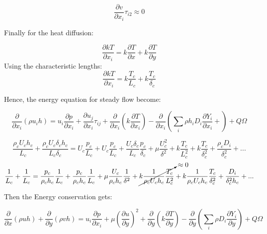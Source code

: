 \begin{equation} 
\frac{\partial v}{\partial x_i}\tau_{i2}\approx0
\end{equation} 

Finally for the heat diffusion:

\begin{equation} 
\frac{\partial kT}{\partial x_i}
=
k
\frac{\partial T}{\partial x}+
k
\frac{\partial T}{\partial y}
\end{equation} 
%
Using the characteristic lengths: 
%
\begin{equation} 
\frac{\partial kT}{\partial x_i}
=
k
\frac{ T_c}{L_c}
+
k
\frac{ T_c}{\delta_c}
\end{equation} 
%

Hence, the energy equation for steady flow become:

\begin{equation} 
\frac{\partial}{\partial x_i}(\rho u_i h)=
u_i\frac{\partial p}{\partial x_i}+
\frac{\partial u_j}{\partial x_i}\tau_{ij}
+
\frac{\partial}{\partial x_i}\left(k\frac{\partial T}{\partial x_i}\right)
-
\frac{\partial }{\partial x_i}
\left(
\sum_i\rho h_iD_i\frac{\partial Y_i}{\partial x_i}+
\right)
+
Q\Omega
\end{equation} 

\begin{equation} 
\frac{\rho_c U_c h_c}{L_c}
+
\frac{\rho_c U_c\delta_c h_c}{L_c\delta_c}
=
U_c\frac{p_c}{L_c}
+
U_c\frac{p_c}{L_c}
+
\frac{U_c\delta_c}{L_c}
\frac{p_c}{\delta_c}
+
\mu\frac{U_c^2}{\delta^2}
+
k
\frac{ T_c}{L_c^2}
+
k
\frac{ T_c}{\delta_c^2}
+
\frac{\rho_cD_i}{\delta_c^2}
+...
\end{equation} 
%
\begin{equation} 
\frac{1}{L_c}
+
\frac{1}{L_c}
=
\frac{p_c}{\rho_c h_c}
\frac{1}{L_c}
+
\frac{p_c}{\rho_c  h_c}
\frac{1}{L_c}
+
\mu
\frac{U_c}{\rho_c  h_c}
\frac{1}{\delta^2}
+
\cancelto{\approx0}{
k
\frac{1}{\rho_c U_c h_c}
\frac{ T_c}{L_c^2}
}
+
k
\frac{1}{\rho_c U_c h_c}
\frac{ T_c}{\delta_c^2}
+
\frac{D_i}{\delta_c^2h_c}
+...
\end{equation} 

Then the Energy conservation gets:

\begin{equation} 
\frac{\partial}{\partial x}(\rho u h)
+
\frac{\partial}{\partial y}(\rho v h)
=
u_i\frac{\partial p}{\partial x_i}
+
\mu
\left(\frac{\partial u}{\partial y}\right)^2
+
\frac{\partial }{\partial y}
\left(
k
\frac{\partial T}{\partial y}
\right)
-
\frac{\partial}{\partial y}
\left(
\sum_i\rho D_i\frac{\partial Y_i}{\partial y}
\right)
+
Q\Omega
\end{equation} 

